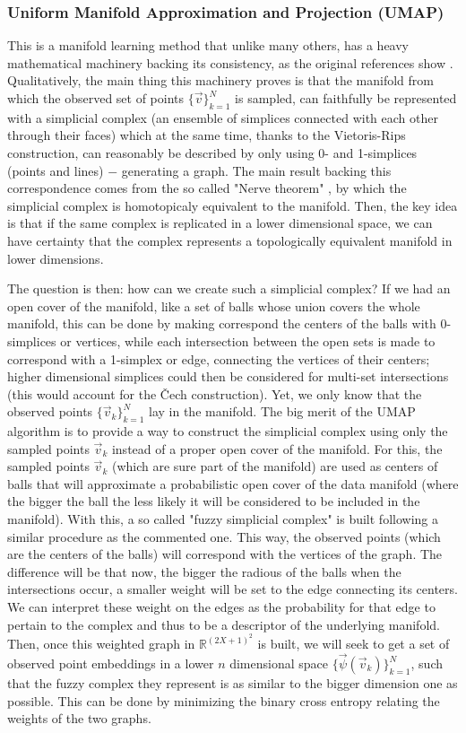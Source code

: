 \documentclass[11pt, a4paper, twoside]{article} %
\newcommand{\R}{\mathbb{R}} %
\DeclareRobustCommand{\mybox}[2][gray!10]{%
\begin{tcolorbox}[   %
        left=0.2cm,
        right=0.2cm,
        top=0.15cm,
        bottom=0.15cm,
        colback=#1,
        colframe=#1,
        width=\dimexpr\textwidth\relax, 
        enlarge left by=0mm,
        boxsep=5pt,
        arc=0pt,outer arc=0pt,
        ]
        #2
\end{tcolorbox}
}
\begin{document}
\subsubsection*{Uniform Manifold Approximation and Projection (UMAP)}
This is a manifold learning method that unlike many others, has a heavy mathematical machinery backing its consistency, as the original references show \cite{umap,umaplearn}. Qualitatively, the main thing this machinery proves is that the manifold from which the observed set of points $\{\vec{v}\}_{k=1}^N$ is sampled, can faithfully be represented with a simplicial complex (an ensemble of simplices connected with each other through their faces) which at the same time, thanks to the Vietoris-Rips construction, can reasonably be described by only using 0- and 1-simplices (points and lines) $-$ generating a graph. The main result backing this correspondence comes from the so called "Nerve theorem" \cite{nerve, umap}, by which the simplicial complex is homotopicaly equivalent to the manifold. Then, the key idea is that if the same complex is replicated in a lower dimensional space, we can have certainty that the complex represents a topologically equivalent manifold in lower dimensions. \\

\mybox{The question is then: how can we create such a simplicial complex? If we had an open cover of the manifold, like a set of balls whose union covers the whole manifold, this can be done by making correspond the centers of the balls with 0-simplices or vertices, while each intersection between the open sets is made to correspond with a 1-simplex or edge, connecting the vertices of their centers; higher dimensional simplices could then be considered for multi-set intersections (this would account for the Čech construction). Yet, we only know that the observed points $\{\vec{v}_k\}_{k=1}^N$ lay in the manifold. The big merit of the UMAP algorithm \cite{umap} is to provide a way to construct the simplicial complex using only the sampled points $\vec{v}_k$ instead of a proper open cover of the manifold. For this, the sampled points $\vec{v}_k$ (which are sure part of the manifold) are used as centers of balls that will approximate a probabilistic open cover of the data manifold (where the bigger the ball the less likely it will be considered to be included in the manifold). With this, a so called "fuzzy simplicial complex" is built following a similar procedure as the commented one. This way, the observed points (which are the centers of the balls) will correspond with the vertices of the graph. The difference will be that now, the bigger the radious of the balls when the intersections occur, a smaller weight will be set to the edge connecting its centers. We can interpret these weight on the edges as the probability for that edge to pertain to the complex and thus to be a descriptor of the underlying manifold. Then, once this weighted graph in $\R^{(2X+1)^2}$ is built, we will seek to get a set of observed point embeddings in a lower $n$ dimensional space $\{\vec{\psi}(\vec{v}_k)\}_{k=1}^N$, such that the fuzzy complex they represent is as similar to the bigger dimension one as possible. This can be done by minimizing the binary cross entropy relating the weights of the two graphs. }
\end{document}
